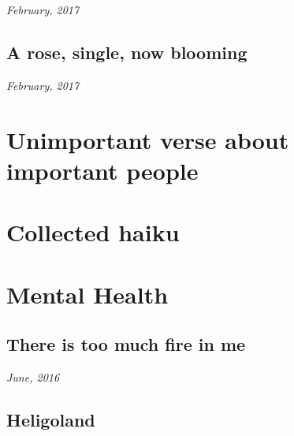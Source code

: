\documentclass[11pt]{memoir}
\begin{document}
    \hfill\textit{February, 2017}

    
    \newpage


    \section*{A rose, single, now blooming}

    \hfill\textit{February, 2017}
    \null
    


    \chapter{Unimportant verse about important people}
    \thispagestyle{empty}
    \newpage


    


    \chapter{Collected haiku}
    \thispagestyle{empty}
    \newpage


    
    \cleartoverso


    \chapter{Mental Health}
    \thispagestyle{empty}
    \newpage


    \section*{There is too much fire in me}

    \hfill\textit{June, 2016}

    
    \newpage


    \section*{Heligoland}
\end{document}
